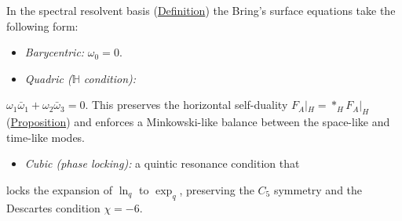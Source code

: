 \begin{remark}
  \label{rem:omega-constraints}
In the spectral resolvent basis
(\hyperref[def:quaternionic-spectral-resolvents]{Definition}) the
Bring's surface equations take the following form:

\begin{itemize}
  \item \emph{Barycentric:} $\omega_0=0$.
  \item \emph{Quadric ($\mathbb{H}$ condition):}
\end{itemize}
  $\omega_1\bar{\omega}_1+\omega_2\bar{\omega}_3=0$.
  This preserves the horizontal self-duality $F_A|_H={*_H}F_A|_H$
  (\hyperref[prop:self-dual-curvature]{Proposition}) and enforces a
  Minkowski-like balance between the space-like and time-like modes.
\begin{itemize}
  \item \emph{Cubic (phase locking):} a quintic resonance condition that
\end{itemize}
  locks the expansion of $\ln_q$ to $\exp_q$, preserving the $C_5$
  symmetry and the Descartes condition $\chi=-6$.
\end{remark}

